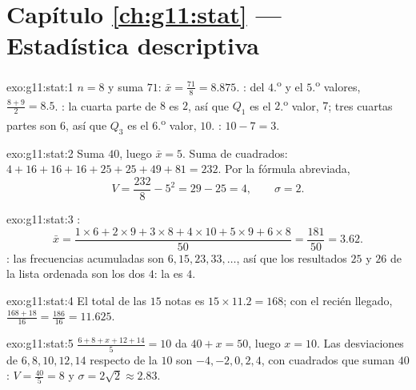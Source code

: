 \section*{Capítulo \ref{ch:g11:stat} --- Estadística descriptiva}

\begin{solution}{exo:g11:stat:1}
$n = 8$ y suma $71$:  $\bar x = \frac{71}{8} = 8.875$. :  del $4$.\textsuperscript{o} y el $5$.\textsuperscript{o} valores,
$\frac{8 + 9}{2} = 8.5$. : la cuarta parte de $8$ es $2$, así que
$Q_1$ es el $2$.\textsuperscript{o} valor, $7$; tres cuartas partes son
$6$, así que $Q_3$ es el $6$.\textsuperscript{o} valor, $10$. : $10 - 7 = 3$.
\end{solution}

\begin{solution}{exo:g11:stat:2}
Suma $40$, luego $\bar x = 5$. Suma de cuadrados:
$4 + 16 + 16 + 16 + 25 + 25 + 49 + 81 = 232$. Por la fórmula abreviada,
\[
V = \frac{232}{8} - 5^2 = 29 - 25 = 4,
\qquad
\sigma = 2 .
\]
\end{solution}

\begin{solution}{exo:g11:stat:3}
:
\[
\bar x = \frac{1 \times 6 + 2 \times 9 + 3 \times 8 + 4 \times 10
+ 5 \times 9 + 6 \times 8}{50}
= \frac{181}{50} = 3.62 .
\]
: las frecuencias acumuladas son $6, 15, 23, 33, \dots$, así que
los resultados $25$ y $26$ de la lista ordenada son los dos $4$: la
 es $4$.
\end{solution}

\begin{solution}{exo:g11:stat:4}
El total de las $15$ notas es $15 \times 11.2 = 168$; con el recién
llegado, $\frac{168 + 18}{16} = \frac{186}{16} = 11.625$.
\end{solution}

\begin{solution}{exo:g11:stat:5}
$\frac{6 + 8 + x + 12 + 14}{5} = 10$ da $40 + x = 50$, luego $x = 10$. Las
desviaciones de $6, 8, 10, 12, 14$ respecto de la  $10$ son
$-4, -2, 0, 2, 4$, con cuadrados que suman $40$: $V = \frac{40}{5} = 8$ y
$\sigma = 2\sqrt2 \approx 2.83$.
\end{solution}

